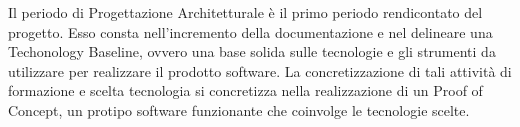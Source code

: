 Il periodo di Progettazione Architetturale è il primo periodo rendicontato del progetto. Esso consta nell'incremento della documentazione e nel delineare una Techonology Baseline, ovvero una base solida sulle tecnologie e gli strumenti da utilizzare per realizzare il prodotto software. La concretizzazione di tali attività di formazione e scelta tecnologia si concretizza nella realizzazione di un Proof of Concept, un protipo software funzionante che coinvolge le tecnologie scelte.